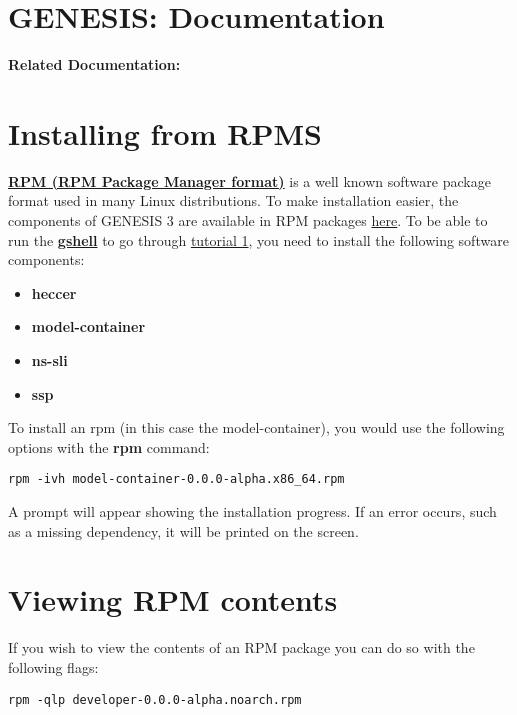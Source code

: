 \documentclass[12pt]{article}
\begin{document}
\section*{GENESIS: Documentation}

{\bf Related Documentation:}

\section*{Installing from RPMS}

\href{http://rpm.org}{\bf RPM (RPM Package Manager format)} is a well known software package format used in many Linux distributions. To make installation easier, the components of GENESIS 3 are available in RPM packages \href{http://repo-genesis3.cbi.utsa.edu/rpm/}{here}. To be able to run the \href{../gshell/gshell.tex}{\bf gshell} to go through \href{../tutorial1/tutorial1.tex}{tutorial 1}, you need to install the following software components:

\begin{itemize}
	\item[] {\bf heccer}
	\item[] {\bf model-container}
	\item[] {\bf ns-sli}
	\item[] {\bf ssp}
\end{itemize}

To install an rpm (in this case the model-container), you would use the following options with the {\bf rpm} command:

\begin{verbatim}
rpm -ivh model-container-0.0.0-alpha.x86_64.rpm
\end{verbatim}

A prompt will appear showing the installation progress. If an error occurs, such as a missing dependency, it will be printed on the screen. 


\section*{Viewing RPM contents}

If you wish to view the contents of an RPM package you can do so with the following flags:

\begin{verbatim}
rpm -qlp developer-0.0.0-alpha.noarch.rpm
\end{verbatim}
\end{document}
